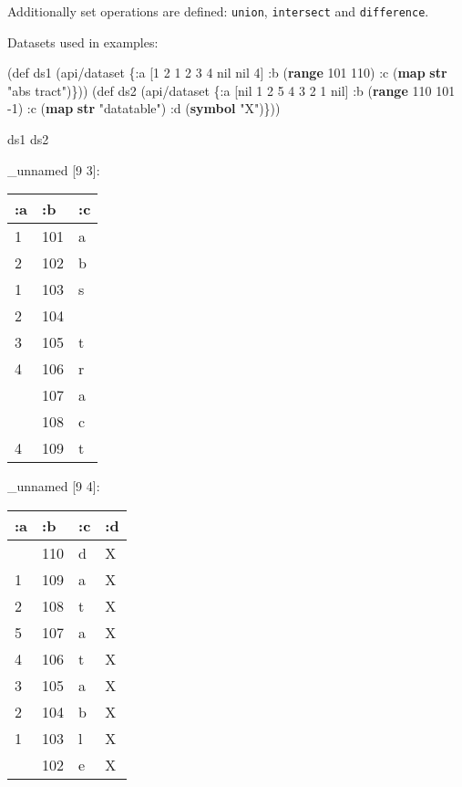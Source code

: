 \documentclass[]{article}
\newenvironment{Shaded}{\begin{snugshade}}{\end{snugshade}}
\newcommand{\KeywordTok}[1]{\textcolor[rgb]{0.13,0.29,0.53}{\textbf{#1}}}
\newcommand{\DecValTok}[1]{\textcolor[rgb]{0.00,0.00,0.81}{#1}}
\newcommand{\StringTok}[1]{\textcolor[rgb]{0.31,0.60,0.02}{#1}}
\newcommand{\FunctionTok}[1]{\textcolor[rgb]{0.00,0.00,0.00}{#1}}
\newcommand{\VariableTok}[1]{\textcolor[rgb]{0.00,0.00,0.00}{#1}}
\newcommand{\BuiltInTok}[1]{#1}
\newcommand{\AttributeTok}[1]{\textcolor[rgb]{0.77,0.63,0.00}{#1}}
\newcommand{\NormalTok}[1]{#1}
\begin{document}
Additionally set operations are defined: \texttt{union},
\texttt{intersect} and \texttt{difference}.

Datasets used in examples:

\begin{Shaded}
\begin{Highlighting}[]
\NormalTok{(}\BuiltInTok{def}\FunctionTok{ ds1 }\NormalTok{(api/dataset \{}\AttributeTok{:a}\NormalTok{ [}\DecValTok{1} \DecValTok{2} \DecValTok{1} \DecValTok{2} \DecValTok{3} \DecValTok{4} \VariableTok{nil} \VariableTok{nil} \DecValTok{4}\NormalTok{]}
                       \AttributeTok{:b}\NormalTok{ (}\KeywordTok{range} \DecValTok{101} \DecValTok{110}\NormalTok{)}
                       \AttributeTok{:c}\NormalTok{ (}\KeywordTok{map} \KeywordTok{str} \StringTok{"abs tract"}\NormalTok{)\}))}
\NormalTok{(}\BuiltInTok{def}\FunctionTok{ ds2 }\NormalTok{(api/dataset \{}\AttributeTok{:a}\NormalTok{ [}\VariableTok{nil} \DecValTok{1} \DecValTok{2} \DecValTok{5} \DecValTok{4} \DecValTok{3} \DecValTok{2} \DecValTok{1} \VariableTok{nil}\NormalTok{]}
                       \AttributeTok{:b}\NormalTok{ (}\KeywordTok{range} \DecValTok{110} \DecValTok{101} \DecValTok{-1}\NormalTok{)}
                       \AttributeTok{:c}\NormalTok{ (}\KeywordTok{map} \KeywordTok{str} \StringTok{"datatable"}\NormalTok{)}
                       \AttributeTok{:d}\NormalTok{ (}\KeywordTok{symbol} \StringTok{"X"}\NormalTok{)\}))}
\end{Highlighting}
\end{Shaded}

\begin{Shaded}
\begin{Highlighting}[]
\NormalTok{ds1}
\NormalTok{ds2}
\end{Highlighting}
\end{Shaded}

\_unnamed {[}9 3{]}:

\begin{longtable}[]{@{}lll@{}}
\toprule
:a & :b & :c\tabularnewline
\midrule
\endhead
1 & 101 & a\tabularnewline
2 & 102 & b\tabularnewline
1 & 103 & s\tabularnewline
2 & 104 &\tabularnewline
3 & 105 & t\tabularnewline
4 & 106 & r\tabularnewline
& 107 & a\tabularnewline
& 108 & c\tabularnewline
4 & 109 & t\tabularnewline
\bottomrule
\end{longtable}

\_unnamed {[}9 4{]}:

\begin{longtable}[]{@{}llll@{}}
\toprule
:a & :b & :c & :d\tabularnewline
\midrule
\endhead
& 110 & d & X\tabularnewline
1 & 109 & a & X\tabularnewline
2 & 108 & t & X\tabularnewline
5 & 107 & a & X\tabularnewline
4 & 106 & t & X\tabularnewline
3 & 105 & a & X\tabularnewline
2 & 104 & b & X\tabularnewline
1 & 103 & l & X\tabularnewline
& 102 & e & X\tabularnewline
\bottomrule
\end{longtable}
\end{document}
